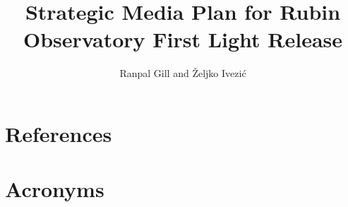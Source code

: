 \documentclass[LPM,lsstdraft,authoryear,toc]{lsstdoc}
\title{Strategic Media Plan for Rubin Observatory First Light Release}
\author{%
Ranpal Gill and
\v{Z}eljko Ivezi\'{c}
}
\date{\vcsDate}
\begin{document}
\maketitle


\appendix

\section{References} \label{sec:bib}
\renewcommand{\refname}{} %


\section{Acronyms} \label{sec:acronyms}

\end{document}
